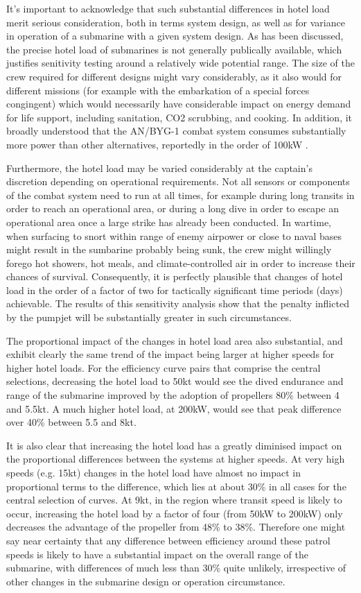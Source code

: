 \documentclass{article}\usepackage[]{graphicx}\usepackage[]{color}
\begin{document}
It's important to acknowledge that such substantial differences in hotel load merit serious consideration, both in terms system design, as well as for variance in operation of a submarine with a given system design.  As has been discussed, the precise hotel load of submarines is not generally publically available, which justifies senitivity testing around a relatively wide potential range.  The size of the crew required for different designs might vary considerably, as it also would for different missions (for example with the embarkation of a special forces congingent) which would necessarily have considerable impact on energy demand for life support, including sanitation, CO2 scrubbing, and cooking. In addition, it broadly understood that the AN/BYG-1 combat system consumes substantially more power than other alternatives, reportedly in the order of 100kW \parencite{patrick2011}.

Furthermore, the hotel load may be varied considerably at the captain's discretion depending on operational requirements.  Not all sensors or components of the combat system need to run at all times, for example during long transits in order to reach an operational area, or during a long dive in order to escape an operational area once a large strike has already been conducted.  In wartime, when surfacing to snort within range of enemy airpower or close to naval bases might result in the sumbarine probably being sunk, the crew might willingly forego hot showers, hot meals, and climate-controlled air in order to increase their chances of survival.  Consequently, it is perfectly plausible that changes of hotel load in the order of a factor of two for tactically significant time periods (days) achievable.  The results of this sensitivity analysis show that the penalty inflicted by the pumpjet will be substantially greater in such circumstances.

The proportional impact of the changes in hotel load area also substantial, and exhibit clearly the same trend of the impact being larger at higher speeds for higher hotel loads. For the efficiency curve pairs that comprise the central selections, decreasing the hotel load to 50kt would see the dived endurance and range of the submarine improved by the adoption of propellers 80\% between 4 and 5.5kt. A much higher hotel load, at 200kW, would see that peak difference over 40\% between 5.5 and 8kt.

It is also clear that increasing the hotel load has a greatly diminised impact on the proportional differences between the systems at higher speeds.  At very high speeds (e.g. 15kt) changes in the hotel load have almost no impact in proportional terms to the difference, which lies at about 30\% in all cases for the central selection of curves. At 9kt, in the region where transit speed is likely to occur, increasing the hotel load by a factor of four (from 50kW to 200kW) only decreases the advantage of the propeller from 48\% to 38\%. Therefore one might say near certainty that any difference between efficiency around these patrol speeds is likely to have a substantial impact on the overall range of the submarine, with differences of much less than 30\% quite unlikely, irrespective of other changes in the submarine design or operation circumstance.
\end{document}

